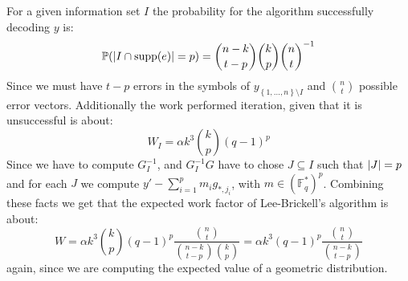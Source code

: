 For a given information set $I$ the probability for the algorithm successfully decoding $y$ is:
\begin{equation*}
  \mathbb{P}(\left\lvert I \cap \textnormal{supp}(e)\right\rvert = p) = \binom{n - k}{t - p}\binom{k}{p}\binom{n}{t}^{-1}
\end{equation*}
Since we must have $t - p$ errors in the symbols of $y_{\left\{1, \ldots, n\right\} \setminus I}$ and $\binom{n}{t}$ possible error vectors. Additionally the work performed iteration, given that it is unsuccessful is about:
\begin{equation*}
  W_I = \alpha k^3 \binom{k}{p} (q - 1)^{p}
\end{equation*}
Since we have to compute $G_I^{-1}$, and $G_I^{-1}G$ have to chose $J \subseteq I$ such that $\left\lvert J\right\rvert = p$ and for each $J$ we compute $y' - \sum^p_{i = 1} m_i g_{*, j_i}$, with $m \in (\mathbb{F}_q^{*})^{p}$. Combining these facts we get that the expected work factor of Lee-Brickell's algorithm is about:
\begin{equation*}
  W = \alpha k^{3} \binom{k}{p} (q - 1)^p\dfrac{\binom{n}{t}}{\binom{n - k}{t - p}\binom{k}{p}} = \alpha k^3 (q - 1)^{p} \dfrac{\binom{n}{t}}{\binom{n - k}{t - p}}
\end{equation*}
again, since we are computing the expected value of a geometric distribution.

